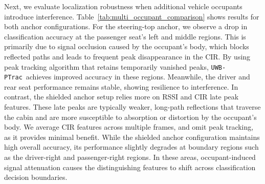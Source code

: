 \documentclass[sigconf]{acmart}
\newcommand{\name}{{{\tt UWB-PTrac}}}
\begin{document}
Next, we evaluate localization robustness when additional 
vehicle occupants introduce interference.
%
Table~\ref{tab:multi_occupant_comparison} shows results for both anchor configurations.
%
For the steering-top anchor, we observe a drop in classification accuracy at the passenger seat’s left and middle regions. This is primarily due to signal occlusion caused by the occupant’s body, which blocks reflected paths and leads to frequent peak disappearance in the CIR. By using peak tracking algorithm that retains temporarily vanished peaks, \name\ 
achieves improved accuracy in these regions. 
Meanwhile, the driver and rear seat performance remains stable, showing resilience to interference.
%
In contrast, the shielded anchor setup relies more on RSSI and 
CIR late peak features. These late peaks are typically weaker, long-path reflections that traverse the cabin and are more susceptible to absorption or distortion by the occupant’s body. We average CIR features across 
multiple frames, and omit peak tracking, as it provides minimal benefit.
%
While the shielded anchor configuration maintains high overall accuracy, its performance slightly degrades at boundary regions such as the driver-right and passenger-right regions. In these areas, occupant-induced signal attenuation causes the distinguishing features to shift across classification decision boundaries.

\end{document}
